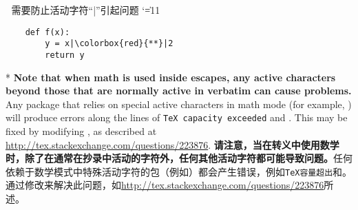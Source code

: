 \begin{optionlist}
\begin{paracol}{2}
\begin{example}
\begin{verbatim}
    \end{verbatim}
\end{example}
\endgroup
\switchcolumn
\begingroup  ^^A 需要防止活动字符“|”引起问题
\catcode`\|=11
\begin{example}
    \begin{verbatim}
    def f(x):
        y = x|\colorbox{red}{**}|2
        return y
    \end{verbatim}
\end{example}
\endgroup
\switchcolumn[0]*%
\textbf{Note that when math is used inside escapes, any active characters beyond those that are normally active in verbatim can cause problems.}  Any package that relies on special active characters in math mode (for example, ) will produce errors along the lines of \texttt{TeX capacity exceeded} and \texttt{\string\leavevmode \string\kern \string\z@}.  This may be fixed by modifying \texttt{\string\@noligs}, as described at \url{http://tex.stackexchange.com/questions/223876}.
\switchcolumn
\textbf{请注意，当在转义中使用数学时，除了在通常在抄录中活动的字符外，任何其他活动字符都可能导致问题。}任何依赖于数学模式中特殊活动字符的包（例如）都会产生错误，例如\texttt{TeX容量超出}和\texttt{\string\leavevmode \string\kern \string\z@}。通过修改\texttt{\string\@noligs}来解决此问题，如\url{http://tex.stackexchange.com/questions/223876}所述。
\end{paracol}
\end{optionlist}